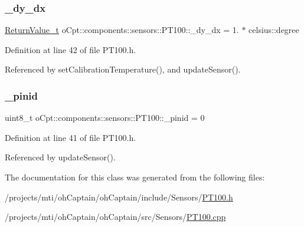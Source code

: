 \subsubsection{\texorpdfstring{\+\_\+dy\+\_\+dx}{\_dy\_dx}}
{\footnotesize\ttfamily \hyperlink{classo_cpt_1_1components_1_1sensors_1_1_p_t100_a46c281d97bd4bd34e16f486a6aeda82e}{Return\+Value\+\_\+t} o\+Cpt\+::components\+::sensors\+::\+P\+T100\+::\+\_\+dy\+\_\+dx = 1. $\ast$ celsius\+::degree\hspace{0.3cm}{\ttfamily [private]}}



Definition at line 42 of file P\+T100.\+h.



Referenced by set\+Calibration\+Temperature(), and update\+Sensor().

\hypertarget{classo_cpt_1_1components_1_1sensors_1_1_p_t100_ac49f21dd8a8f2c7cd7e377512f5e9b25}{}\label{classo_cpt_1_1components_1_1sensors_1_1_p_t100_ac49f21dd8a8f2c7cd7e377512f5e9b25} 
\subsubsection{\texorpdfstring{\+\_\+pinid}{\_pinid}}
{\footnotesize\ttfamily uint8\+\_\+t o\+Cpt\+::components\+::sensors\+::\+P\+T100\+::\+\_\+pinid = 0\hspace{0.3cm}{\ttfamily [private]}}



Definition at line 41 of file P\+T100.\+h.



Referenced by update\+Sensor().



The documentation for this class was generated from the following files\+:\begin{DoxyCompactItemize}
\item 
/projects/mti/oh\+Captain/oh\+Captain/include/\+Sensors/\hyperlink{_p_t100_8h}{P\+T100.\+h}\item 
/projects/mti/oh\+Captain/oh\+Captain/src/\+Sensors/\hyperlink{_p_t100_8cpp}{P\+T100.\+cpp}\end{DoxyCompactItemize}
